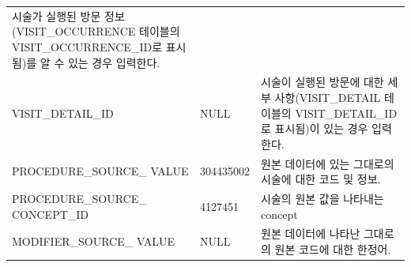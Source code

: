 \documentclass[10.5pt]{book}
\theoremstyle{definition}
\theoremstyle{definition}
\theoremstyle{definition}
\theoremstyle{remark}
\begin{document}
\begin{longtable}[]{@{}lll@{}}
\begin{minipage}[t]{0.48\columnwidth}
시술가 실행된 방문 정보(VISIT\_OCCURRENCE 테이블의
VISIT\_OCCURRENCE\_ID로 표시됨)를 알 수 있는 경우 입력한다.\strut
\end{minipage}\tabularnewline
\begin{minipage}[t]{0.28\columnwidth}\raggedright\strut
VISIT\_DETAIL\_ID\strut
\end{minipage} & \begin{minipage}[t]{0.16\columnwidth}\raggedright\strut
NULL\strut
\end{minipage} & \begin{minipage}[t]{0.48\columnwidth}\raggedright\strut
시술이 실행된 방문에 대한 세부 사항(VISIT\_DETAIL 테이블의
VISIT\_DETAIL\_ID로 표시됨)이 있는 경우 입력한다.\strut
\end{minipage}\tabularnewline
\begin{minipage}[t]{0.28\columnwidth}\raggedright\strut
PROCEDURE\_SOURCE\_ VALUE\strut
\end{minipage} & \begin{minipage}[t]{0.16\columnwidth}\raggedright\strut
304435002\strut
\end{minipage} & \begin{minipage}[t]{0.48\columnwidth}\raggedright\strut
원본 데이터에 있는 그대로의 시술에 대한 코드 및 정보.\strut
\end{minipage}\tabularnewline
\begin{minipage}[t]{0.28\columnwidth}\raggedright\strut
PROCEDURE\_SOURCE\_ CONCEPT\_ID\strut
\end{minipage} & \begin{minipage}[t]{0.16\columnwidth}\raggedright\strut
4127451\strut
\end{minipage} & \begin{minipage}[t]{0.48\columnwidth}\raggedright\strut
시술의 원본 값을 나타내는 concept\strut
\end{minipage}\tabularnewline
\begin{minipage}[t]{0.28\columnwidth}\raggedright\strut
MODIFIER\_SOURCE\_ VALUE\strut
\end{minipage} & \begin{minipage}[t]{0.16\columnwidth}\raggedright\strut
NULL\strut
\end{minipage} & \begin{minipage}[t]{0.48\columnwidth}\raggedright\strut
원본 데이터에 나타난 그대로의 원본 코드에 대한 한정어.\strut
\end{minipage}\tabularnewline
\bottomrule
\end{longtable}
\end{document}
